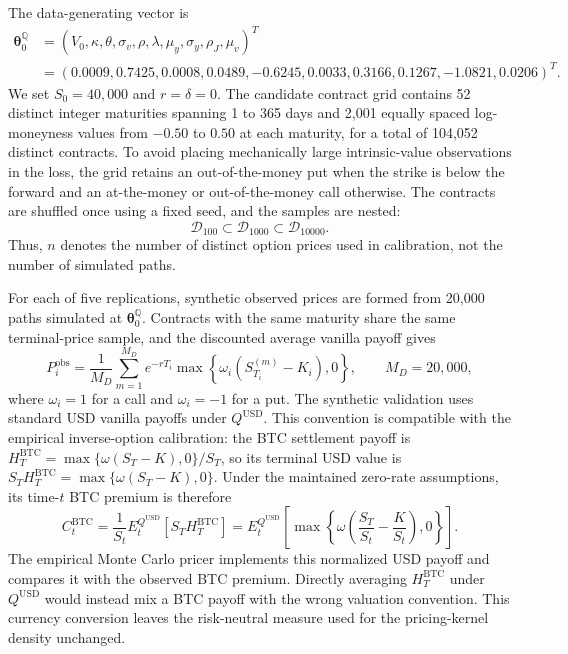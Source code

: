 The data-generating vector is
\begin{align}
\boldsymbol{\theta}^{\mathbb Q}_0
&=\left(V_0,\kappa,\theta,\sigma_v,\rho,\lambda, \mu_y,\sigma_y,\rho_J,\mu_v\right)^{T} \\ 
&=\left(0.0009,0.7425,0.0008,0.0489,-0.6245,
       0.0033,0.3166,0.1267,-1.0821,0.0206\right)^{T}.
\label{eq:q_simulation_true_parameters}
\end{align}
We set $S_0=40{,}000$ and $r=\delta=0$. The candidate contract grid
contains 52 distinct integer maturities spanning 1 to 365 days and 2,001
equally spaced log-moneyness values from $-0.50$ to $0.50$ at each maturity,
for a total of 104,052 distinct contracts. To avoid placing mechanically
large intrinsic-value observations in the loss, the grid retains an
out-of-the-money put when the strike is below the forward and an
at-the-money or out-of-the-money call otherwise. The contracts are shuffled
once using a fixed seed, and the samples are nested:
\begin{equation}
\mathcal D_{100}\subset\mathcal D_{1000}\subset\mathcal D_{10000}.
\end{equation}
Thus, $n$ denotes the number of distinct option prices used in calibration,
not the number of simulated paths.

For each of five replications, synthetic observed prices are formed from
20,000 paths simulated at $\boldsymbol{\theta}^{\mathbb Q}_0$. Contracts with
the same maturity share the same terminal-price sample, and the discounted
average vanilla payoff gives
\begin{equation}
P_i^{\mathrm{obs}}
=\frac{1}{M_D}\sum_{m=1}^{M_D}
 e^{-rT_i}\max\!\left\{\omega_i
 \left(S_{T_i}^{(m)}-K_i\right),0\right\},
\qquad M_D=20{,}000,
\label{eq:q_simulation_observed_price}
\end{equation}
where $\omega_i=1$ for a call and $\omega_i=-1$ for a put. The synthetic
validation uses standard USD vanilla payoffs under $Q^{\mathrm{USD}}$.
This convention is compatible with the empirical inverse-option calibration:
the BTC settlement payoff is
$H_T^{\mathrm{BTC}}=\max\{\omega(S_T-K),0\}/S_T$, so its terminal USD
value is $S_T H_T^{\mathrm{BTC}}=\max\{\omega(S_T-K),0\}$. Under the
maintained zero-rate assumptions, its time-$t$ BTC premium is therefore
\begin{equation}
 C_t^{\mathrm{BTC}}
 =\frac{1}{S_t}E_t^{Q^{\mathrm{USD}}}
       [S_T H_T^{\mathrm{BTC}}]
 =E_t^{Q^{\mathrm{USD}}}
       \left[\max\left\{\omega\left(\frac{S_T}{S_t}
                                      -\frac{K}{S_t}\right),0\right\}\right].
 \label{eq:inverse-option-usd-valuation}
\end{equation}
The empirical Monte Carlo pricer implements this normalized USD payoff and
compares it with the observed BTC premium. Directly averaging
$H_T^{\mathrm{BTC}}$ under $Q^{\mathrm{USD}}$ would instead mix a BTC
payoff with the wrong valuation convention. This currency conversion leaves
the risk-neutral measure used for the pricing-kernel density unchanged.

